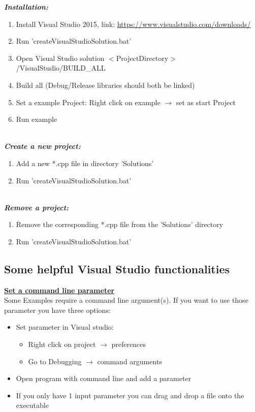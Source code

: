\documentclass[]{article}
\begin{document}
\textit{\textbf{Installation:}}
\begin{enumerate}
	\item Install Visual Studio 2015, link: \url{https://www.visualstudio.com/downloads/}
	\item Run 'createVisualStudioSolution.bat'
	\item Open Visual Studio solution $<$ProjectDirectory$>$/VisualStudio/BUILD\_ALL
	\item Build all (Debug/Release libraries should both be linked)
	\item Set a example Project: Right click on example $\rightarrow$ set as start Project
	\item Run example 
\end{enumerate}

\mbox{} \\
\textit{\textbf{Create a new project:}}
\begin{enumerate}
\item Add a new *.cpp file in directory 'Solutions'
\item Run 'createVisualStudioSolution.bat'
\end{enumerate}

\mbox{} \\
\textit{\textbf{Remove a project:}}
\begin{enumerate}
\item Remove the corresponding *.cpp file from the 'Solutions' directory
\item Run 'createVisualStudioSolution.bat' \\
\end{enumerate}

\subsection{Some helpful Visual Studio functionalities \\}

\underline{\textbf{Set a command line parameter}} \\

Some Examples require a command line argument(s). If you want to use those parameter you have three options:
\begin{itemize}
	\item Set parameter in Visual studio:
	\begin{itemize}
		\item Right click on project $\rightarrow$ preferences
		\item Go to Debugging $\rightarrow$ command arguments
	\end{itemize}
	\item Open program with command line and add a parameter
	\item If you only have 1 input parameter you can drag and drop a file onto the executable
\end{itemize}
\end{document}
